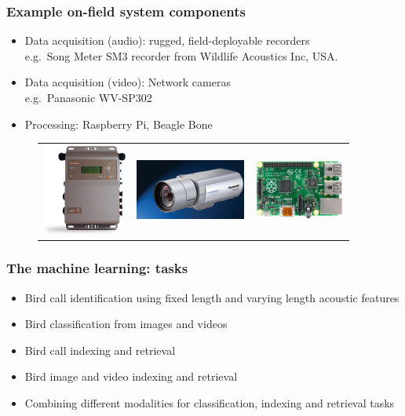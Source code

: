 \documentclass[mathserif]{beamer}
\begin{document}
\begin{frame}
\frametitle{Example on-field system components}
\vspace{-1cm}
\vspace{0.3cm}
\begin{itemize}
\item Data acquisition (audio): rugged, field-deployable recorders \\
e.g.~Song Meter SM3 recorder from Wildlife Acoustics Inc, USA. \\
\item Data acquisition (video): Network cameras \\
e.g.~Panasonic WV-SP302\\
\item Processing: Raspberry Pi, Beagle Bone 
\end{itemize}
\begin{figure}
	\begin{tabular}{c c c}
	\includegraphics[height=3cm]{figures/songMeter.png}&
	\includegraphics[height=2cm]{figures/pan_cam.png}&
	\includegraphics[height=2cm]{figures/rasp.jpg}
	\end{tabular}
	\end{figure}
\end{frame}


\begin{frame}
\frametitle{The machine learning: tasks}
\begin{itemize}
\item<2-> Bird call identification using fixed length and varying length acoustic features 
\item<3-> Bird classification from images and videos
\item<4-> Bird call indexing and retrieval
\item<5-> Bird image and video indexing and retrieval
\item<6-> Combining different modalities for classification, indexing and retrieval tasks
\end{itemize}
\end{frame}
\end{document}
